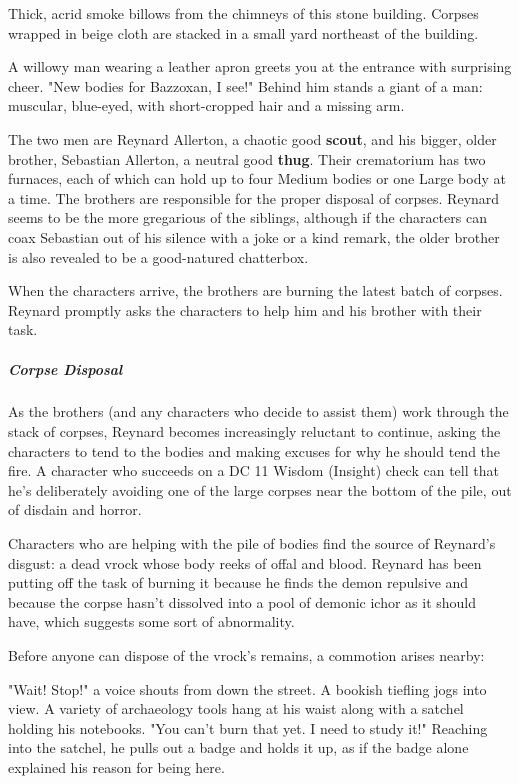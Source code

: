 \documentclass[10pt,a4paper,twoside,fancy,bg=print,twocolumn,openany,nodeprecatedcode]{dndbook}
\begin{document}
\begin{DndReadAloud}{}
Thick, acrid smoke billows from the chimneys of this stone building. Corpses wrapped in beige cloth are stacked in a small yard northeast of the building.

A willowy man wearing a leather apron greets you at the entrance with surprising cheer. "New bodies for Bazzoxan, I see!" Behind him stands a giant of a man: muscular, blue-eyed, with short-cropped hair and a missing arm.

\end{DndReadAloud}

The two men are Reynard Allerton, a chaotic good \textbf{scout}, and his bigger, older brother, Sebastian Allerton, a neutral good \textbf{thug}. Their crematorium has two furnaces, each of which can hold up to four Medium bodies or one Large body at a time. The brothers are responsible for the proper disposal of corpses. Reynard seems to be the more gregarious of the siblings, although if the characters can coax Sebastian out of his silence with a joke or a kind remark, the older brother is also revealed to be a good-natured chatterbox.

When the characters arrive, the brothers are burning the latest batch of corpses. Reynard promptly asks the characters to help him and his brother with their task.

\subparagraph{Corpse Disposal}
As the brothers (and any characters who decide to assist them) work through the stack of corpses, Reynard becomes increasingly reluctant to continue, asking the characters to tend to the bodies and making excuses for why he should tend the fire. A character who succeeds on a DC 11 Wisdom (Insight) check can tell that he's deliberately avoiding one of the large corpses near the bottom of the pile, out of disdain and horror.

Characters who are helping with the pile of bodies find the source of Reynard's disgust: a dead vrock whose body reeks of offal and blood. Reynard has been putting off the task of burning it because he finds the demon repulsive and because the corpse hasn't dissolved into a pool of demonic ichor as it should have, which suggests some sort of abnormality.

Before anyone can dispose of the vrock's remains, a commotion arises nearby:

\begin{DndReadAloud}{}
"Wait! Stop!" a voice shouts from down the street. A bookish tiefling jogs into view. A variety of archaeology tools hang at his waist along with a satchel holding his notebooks. "You can't burn that yet. I need to study it!" Reaching into the satchel, he pulls out a badge and holds it up, as if the badge alone explained his reason for being here.

\end{DndReadAloud}
\end{document}
